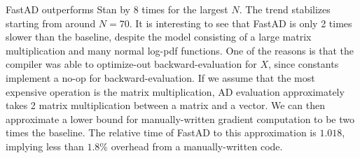 FastAD outperforms Stan by 8 times for the largest $N$.
The trend stabilizes starting from around $N=70$.
It is interesting to see that FastAD is only 2 times slower than the baseline,
despite the model consisting of a large matrix multiplication and many normal log-pdf functions.
One of the reasons is that the compiler was able to optimize-out backward-evaluation for $X$, 
since constants implement a no-op for backward-evaluation.
If we assume that the most expensive operation is the matrix multiplication,
AD evaluation approximately takes 2 matrix multiplication between a matrix and a vector.
We can then approximate a lower bound for manually-written gradient computation to be two times the baseline.
The relative time of FastAD to this approximation is
$1.018$, implying less than $ 1.8\%$ overhead from a manually-written code.
